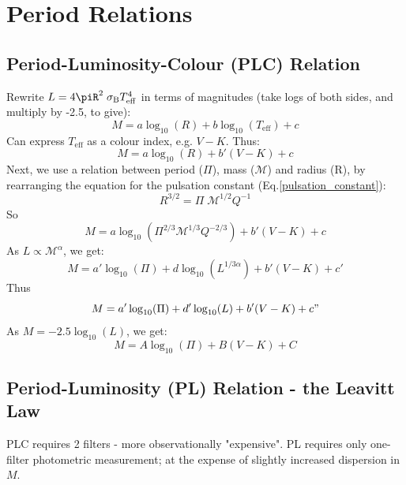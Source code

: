 \documentclass{spy}
\begin{document}
\section{Period Relations}

\subsection{Period-Luminosity-Colour (PLC) Relation}
Rewrite \(L = 4\piR^2 \; \sigma_\mathrm{B} T^4_\mathrm{eff}\) in terms of magnitudes (take logs of both sides, and multiply by -2.5, to give):
\begin{equation}
    M = a\log_\mathrm{10}(R) + b\log_\mathrm{10}(T_\mathrm{eff}) + c
\end{equation}
Can express \(T_\mathrm{eff}\) as a colour index, e.g. \(V-K\). Thus:
\begin{equation}
    M = a\log_\mathrm{10}(R) + b'(V - K) + c
\end{equation}
Next, we use a relation between period (\(\Pi\)), mass (\(\mathcal{M}\)) and radius (R), by rearranging the equation for the pulsation constant (Eq.\ref{pulsation_constant}):
\begin{equation}
    R^{3/2} = \Pi \; \mathcal{M}^{1/2} Q^{-1}
\end{equation}
So
\begin{equation}
    M = a\log_\mathrm{10}(\Pi^{2/3} \mathcal{M}^{1/3} Q^{-2/3}) + b'(V - K) + c
\end{equation}
As \(L \propto \mathcal{M}^\alpha \), we get:
\begin{equation}
    M = a'\log_\mathrm{10}(\Pi) + d\log_\mathrm{10}(L^{1/3\alpha}) + b'(V - K) + c'
\end{equation}
Thus
\begin{equation}
    M = a'\log_\mathrm{10}(\Pi) + d'\log_\mathrm{10}(L) + b'(V - K) + c"
\end{equation}
As \(M = -2.5 \log_\mathrm{10}(L)\), we get:
\begin{equation}
    M = A \log_\mathrm{10}(\Pi) + B (V - K) + C
    \label{plc_relation}
\end{equation}


\subsection{Period-Luminosity (PL) Relation - the Leavitt Law}
PLC requires 2 filters - more observationally "expensive". PL requires only one-filter photometric measurement; at the expense of slightly increased dispersion in \(M\). 
\end{document}
